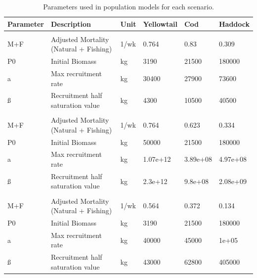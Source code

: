 \documentclass[
]{article}
\begin{document}
\begin{table}

\caption{\label{tab:paramsSCENARIOS}Parameters used in population models for each scenario.}
\centering
\fontsize{10}{12}\selectfont
\begin{tabular}[t]{llllll}
\toprule
Parameter & Description & Unit & Yellowtail & Cod & Haddock\\
\midrule
\addlinespace[0.3em]
\multicolumn{1}{l}{\textbf{Constant Population}}\\
\hspace{1em}M+F & Adjusted Mortality (Natural + Fishing) & 1/wk & 0.764 & 0.83 & 0.309\\
\hspace{1em}P0 & Initial Biomass & kg & 3190 & 21500 & \vphantom{1} 180000\\
\hspace{1em}a & Max recruitment rate & kg & 30400 & 27900 & 73600\\
\hspace{1em}ß & Recruitment half saturation value & kg & 4300 & 10500 & 40500\\
\addlinespace[0.3em]
\multicolumn{1}{l}{\textbf{Decreasing Population}}\\
\hspace{1em}M+F & Adjusted Mortality (Natural + Fishing) & 1/wk & 0.764 & 0.623 & 0.334\\
\hspace{1em}P0 & Initial Biomass & kg & 50000 & 21500 & 180000\\
\hspace{1em}a & Max recruitment rate & kg & 1.07e+12 & 3.89e+08 & 4.97e+08\\
\hspace{1em}ß & Recruitment half saturation value & kg & 2.3e+12 & 9.8e+08 & 2.08e+09\\
\addlinespace[0.3em]
\multicolumn{1}{l}{\textbf{Increasing Population}}\\
\hspace{1em}M+F & Adjusted Mortality (Natural + Fishing) & 1/wk & 0.564 & 0.372 & 0.134\\
\hspace{1em}P0 & Initial Biomass & kg & 3190 & 21500 & 180000\\
\hspace{1em}a & Max recruitment rate & kg & 40000 & 45000 & 1e+05\\
\hspace{1em}ß & Recruitment half saturation value & kg & 43000 & 62800 & 405000\\
\bottomrule
\end{tabular}
\end{table}
\end{document}
